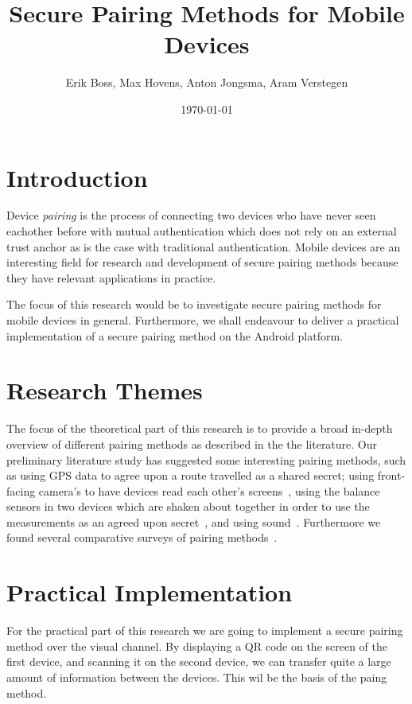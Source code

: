 \documentclass{article}
\title{Secure Pairing Methods for Mobile Devices}
\date{\today}
\author{Erik Boss, Max Hovens, Anton Jongsma, Aram Verstegen}
\begin{document}

\maketitle

\section{Introduction}

Device \textit{pairing} is the process of connecting two devices who have never seen eachother before with mutual authentication which does not rely on an external trust anchor as is the case with traditional authentication.
Mobile devices are an interesting field for research and development of secure pairing methods because they have relevant applications in practice.

The focus of this research would be to investigate secure pairing methods for mobile devices in general.
Furthermore, we shall endeavour to deliver a practical implementation of a secure pairing method on the Android platform.



\section{Research Themes}
The focus of the theoretical part of this research is to provide a broad in-depth overview of different pairing methods as described in the the literature. Our preliminary literature study has suggested some interesting pairing methods, such as using GPS data to agree upon a route travelled as a shared secret; %
using front-facing camera's to have devices read each other's screens~\cite{saxena2006secure},
using the balance sensors in two devices which are shaken about together in order to use the measurements as an agreed upon secret~\cite{mayrhofer2009shake}, and using sound~\cite{soriente2008hapadep}.
Furthermore we found several comparative surveys of pairing methods~\cite{kumar2009comparative}\cite{kobsa2009serial}\cite{uzun2007usability}.


\section{Practical Implementation}

For the practical part of this research we are going to implement a secure pairing method over the visual channel. By displaying a QR code on the screen of the first device, and scanning it on the second device, we can transfer quite a large amount of information between the devices. This wil be the basis of the paing method.
\end{document}
